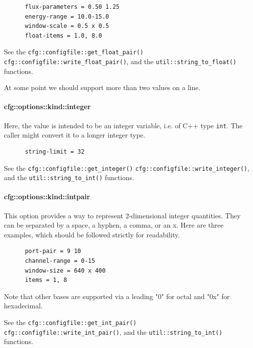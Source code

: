    \begin{verbatim}
      flux-parameters = 0.50 1.25
      energy-range = 10.0-15.0
      window-scale = 0.5 x 0.5
      float-items = 1.0, 8.0
   \end{verbatim}

   See the \texttt{cfg::configfile::get\_float\_pair()}
   \texttt{cfg::configfile::write\_float\_pair()},
   and the \texttt{util::string\_to\_float()} functions.

   At some point we should support more than two values on
   a line.

\paragraph{cfg::options::kind::integer}
\label{paragraph:cfg_namespace_options_kind_integer}

   Here, the value is intended to be an integer variable,
   i.e. of C++ type \texttt{int}.
   The caller might convert it to a longer integer type.

   \begin{verbatim}
      string-limit = 32
   \end{verbatim}

   See the \texttt{cfg::configfile::get\_integer()}
   \texttt{cfg::configfile::write\_integer()},
   and the \texttt{util::string\_to\_int()} functions.

\paragraph{cfg::options::kind::intpair}
\label{paragraph:cfg_namespace_options_kind_intpair}

   This option provides a way to represent 2-dimensional
   integer quantities.
   They can be separated by a space, a hyphen, a comma, or an x.
   Here are three examples, which should be followed
   strictly for readability.

   \begin{verbatim}
      port-pair = 9 10
      channel-range = 0-15
      window-size = 640 x 400
      items = 1, 8
   \end{verbatim}

   Note that other bases are supported via a leading "0"
   for octal and "0x" for hexadecimal.

   See the \texttt{cfg::configfile::get\_int\_pair()}
   \texttt{cfg::configfile::write\_int\_pair()},
   and the \texttt{util::string\_to\_int()} functions.

